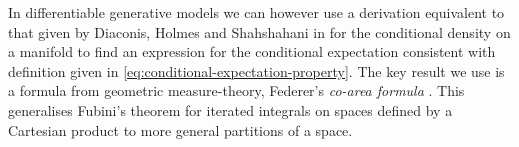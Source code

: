 In differentiable generative models we can however use a derivation equivalent to that given by Diaconis, Holmes and Shahshahani in \citep{diaconis2013sampling} for the conditional density on a manifold to find an expression for the conditional expectation consistent with definition given in \eqref{eq:conditional-expectation-property}. %
The key result we use is a formula from geometric measure-theory, Federer's \emph{co-area formula} \citep[\S 3.2.12]{federer1969geometric}. This generalises Fubini's theorem for iterated integrals on spaces defined by a Cartesian product to more general partitions of a space.%

